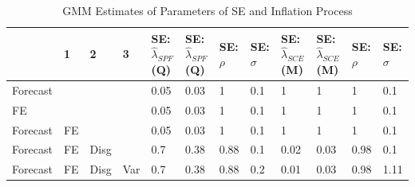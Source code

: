 \documentclass[]{article}
\begin{document}
	\begin{table}
		\centering
	\caption{GMM Estimates of Parameters of SE and Inflation Process}
	\label{GMM_Est_SE_Table}
\begin{tabular}{llllllllllll}
	\hline 
	& 1  & 2    & 3   & SE: $\hat\lambda_{SPF}$(Q) & SE: $\hat\lambda_{SPF}$(Q) & SE: $\rho$ & SE: $\sigma$ & SE: $\hat\lambda_{SCE}$(M) & SE: $\hat\lambda_{SCE}$(M) & SE: $\rho$ & SE: $\sigma$ \\
	\hline 
	Forecast &    &      &     & 0.05                       & 0.03                       & 1          & 0.1          & 1                          & 1                          & 1          & 0.1          \\
	FE       &    &      &     & 0.05                       & 0.03                       & 1          & 0.1          & 1                          & 1                          & 1          & 0.1          \\
	Forecast & FE &      &     & 0.05                       & 0.03                       & 1          & 0.1          & 1                          & 1                          & 1          & 0.1          \\
	Forecast & FE & Disg &     & 0.7                        & 0.38                       & 0.88       & 0.1          & 0.02                       & 0.03                       & 0.98       & 0.1          \\
	Forecast & FE & Disg & Var & 0.7                        & 0.38                       & 0.88       & 0.2          & 0.01                       & 0.03                       & 0.98       & 1.11     \\
	\hline    
\end{tabular}
\end{table}
\end{document}
